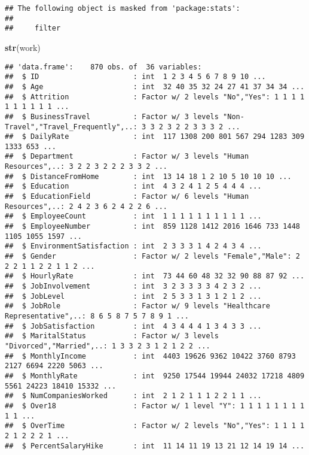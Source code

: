 \documentclass[]{article}
\newenvironment{Shaded}{\begin{snugshade}}{\end{snugshade}}
\newcommand{\KeywordTok}[1]{\textcolor[rgb]{0.13,0.29,0.53}{\textbf{#1}}}
\newcommand{\NormalTok}[1]{#1}
\begin{document}
\begin{verbatim}
## The following object is masked from 'package:stats':
## 
##     filter
\end{verbatim}

\begin{Shaded}
\begin{Highlighting}[]
\KeywordTok{str}\NormalTok{(work)}
\end{Highlighting}
\end{Shaded}

\begin{verbatim}
## 'data.frame':    870 obs. of  36 variables:
##  $ ID                      : int  1 2 3 4 5 6 7 8 9 10 ...
##  $ Age                     : int  32 40 35 32 24 27 41 37 34 34 ...
##  $ Attrition               : Factor w/ 2 levels "No","Yes": 1 1 1 1 1 1 1 1 1 1 ...
##  $ BusinessTravel          : Factor w/ 3 levels "Non-Travel","Travel_Frequently",..: 3 3 2 3 2 2 3 3 3 2 ...
##  $ DailyRate               : int  117 1308 200 801 567 294 1283 309 1333 653 ...
##  $ Department              : Factor w/ 3 levels "Human Resources",..: 3 2 2 3 2 2 2 3 3 2 ...
##  $ DistanceFromHome        : int  13 14 18 1 2 10 5 10 10 10 ...
##  $ Education               : int  4 3 2 4 1 2 5 4 4 4 ...
##  $ EducationField          : Factor w/ 6 levels "Human Resources",..: 2 4 2 3 6 2 4 2 2 6 ...
##  $ EmployeeCount           : int  1 1 1 1 1 1 1 1 1 1 ...
##  $ EmployeeNumber          : int  859 1128 1412 2016 1646 733 1448 1105 1055 1597 ...
##  $ EnvironmentSatisfaction : int  2 3 3 3 1 4 2 4 3 4 ...
##  $ Gender                  : Factor w/ 2 levels "Female","Male": 2 2 2 1 1 2 2 1 1 2 ...
##  $ HourlyRate              : int  73 44 60 48 32 32 90 88 87 92 ...
##  $ JobInvolvement          : int  3 2 3 3 3 3 4 2 3 2 ...
##  $ JobLevel                : int  2 5 3 3 1 3 1 2 1 2 ...
##  $ JobRole                 : Factor w/ 9 levels "Healthcare Representative",..: 8 6 5 8 7 5 7 8 9 1 ...
##  $ JobSatisfaction         : int  4 3 4 4 4 1 3 4 3 3 ...
##  $ MaritalStatus           : Factor w/ 3 levels "Divorced","Married",..: 1 3 3 2 3 1 2 1 2 2 ...
##  $ MonthlyIncome           : int  4403 19626 9362 10422 3760 8793 2127 6694 2220 5063 ...
##  $ MonthlyRate             : int  9250 17544 19944 24032 17218 4809 5561 24223 18410 15332 ...
##  $ NumCompaniesWorked      : int  2 1 2 1 1 1 2 2 1 1 ...
##  $ Over18                  : Factor w/ 1 level "Y": 1 1 1 1 1 1 1 1 1 1 ...
##  $ OverTime                : Factor w/ 2 levels "No","Yes": 1 1 1 1 2 1 2 2 2 1 ...
##  $ PercentSalaryHike       : int  11 14 11 19 13 21 12 14 19 14 ...

\end{verbatim}
\end{document}
